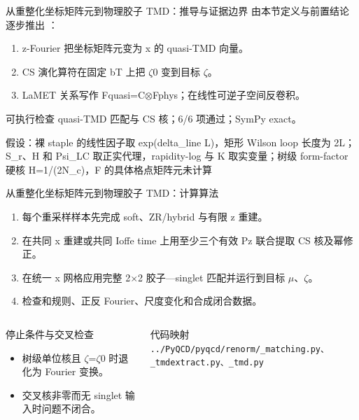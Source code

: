 \begin{frame}[t]{从重整化坐标矩阵元到物理胶子 TMD：推导与证据边界}
\footnotesize
{}\quad 由本节定义与前置结论逐步推出 ：
\begin{enumerate}
\item z-Fourier 把坐标矩阵元变为 x 的 quasi-TMD 向量。
\item CS 演化算符在固定 bT 上把 \ensuremath{\zeta}0 变到目标 \ensuremath{\zeta}。
\item LaMET 关系写作 Fquasi=C\ensuremath{\otimes}Fphys；在线性可逆子空间反卷积。
\end{enumerate}\begin{block}{可执行检查}
\quad quasi-TMD 匹配与 CS 核；6/6 项通过；SymPy exact。
\par\scriptsize 假设：裸 staple 的线性因子取 exp(delta\_line L)，矩形 Wilson loop 长度为 2L；S\_r、H 和 Psi\_LC 取正实代理，rapidity-log 与 K 取实变量；树级 form-factor 硬核 H=1/\allowbreak{}(2N\_c)，F 的具体格点矩阵元未计算
\end{block}
\end{frame}

\begin{frame}[t]{从重整化坐标矩阵元到物理胶子 TMD：计算算法}
\footnotesize
{}\begin{enumerate}
\item 每个重采样样本先完成 soft、ZR/\allowbreak{}hybrid 与有限 z 重建。
\item 在共同 x 重建或共同 Ioffe time 上用至少三个有效 Pz 联合提取 CS 核及幂修正。
\item 在统一 x 网格应用完整 2\ensuremath{\times}2 胶子—singlet 匹配并运行到目标 \ensuremath{\mu}、\ensuremath{\zeta}。
\item 检查和规则、正反 Fourier、尺度变化和合成闭合数据。
\end{enumerate}\begin{columns}[T,onlytextwidth]
\begin{block}{停止条件与交叉检查}\scriptsize\begin{itemize}
\item[\CheckMark] 树级单位核且 \ensuremath{\zeta}=\ensuremath{\zeta}0 时退化为 Fourier 变换。
\item[\CheckMark] 交叉核非零而无 singlet 输入时问题不闭合。
\end{itemize}\end{block}
\begin{block}{代码映射}
\scriptsize \texttt{.\allowbreak{}.\allowbreak{}/\allowbreak{}PyQCD/\allowbreak{}pyqcd/\allowbreak{}renorm/\allowbreak{}\_\allowbreak{}matching.\allowbreak{}py、\_\allowbreak{}tmdextract.\allowbreak{}py、\_\allowbreak{}tmd.\allowbreak{}py}
\end{block}\end{columns}\end{frame}

